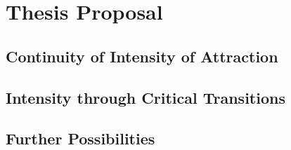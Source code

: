 \section{Thesis Proposal}
\label{sec:proposal}


\subsection{Continuity of Intensity of Attraction}

\subsection{Intensity through Critical Transitions}

\subsection{Further Possibilities}

